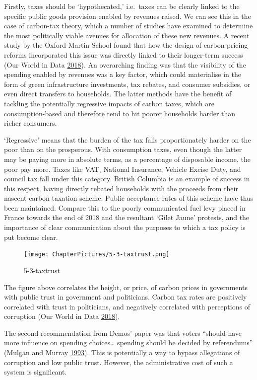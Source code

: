 \documentclass[]{tufte-handout}
\begin{document}
Firstly, taxes should be `hypothecated,' i.e.~taxes can be clearly
linked to the specific public goods provision enabled by revenues
raised. We can see this in the case of carbon-tax theory, which a number
of studies have examined to determine the most politically viable
avenues for allocation of these new revenues. A recent study by the
Oxford Martin School found that how the design of carbon pricing reforms
incorporated this issue was directly linked to their longer-term success
(Our World in Data \protect\hyperlink{ref-OurWorldinData2018}{2018}). An
overarching finding was that the visibility of the spending enabled by
revenues was a key factor, which could materialise in the form of green
infrastructure investments, tax rebates, and consumer subsidies, or even
direct transfers to households. The latter methods have the benefit of
tackling the potentially regressive impacts of carbon taxes, which are
consumption-based and therefore tend to hit poorer households harder
than richer consumers.

`Regressive' means that the burden of the tax falls proportionately
harder on the poor than on the prosperous. With consumption taxes, even
though the latter may be paying more in absolute terms, as a percentage
of disposable income, the poor pay more. Taxes like VAT, National
Insurance, Vehicle Excise Duty, and council tax fall under this
category. British Columbia is an example of success in this respect,
having directly rebated households with the proceeds from their nascent
carbon taxation scheme. Public acceptance rates of this scheme have thus
been maintained. Compare this to the poorly communicated fuel levy
placed in France towards the end of 2018 and the resultant `Gilet Jaune'
protests, and the importance of clear communication about the purposes
to which a tax policy is put become clear.

\begin{figure}
\centering
\texttt{[image: ChapterPictures/5-3-taxtrust.png]}
\caption{5-3-taxtrust}
\end{figure}

The figure above correlates the height, or price, of carbon prices in
governments with public trust in government and politicians. Carbon tax
rates are positively correlated with trust in politicians, and
negatively correlated with perceptions of corruption (Our World in Data
\protect\hyperlink{ref-OurWorldinData2018}{2018}).

The second recommendation from Demos' paper was that voters ``should
have more influence on spending choices\ldots{} spending should be
decided by referendums'' (Mulgan and Murray
\protect\hyperlink{ref-Mulgan1993}{1993}). This is potentially a way to
bypass allegations of corruption and low public trust. However, the
administrative cost of such a system is significant.
\end{document}
